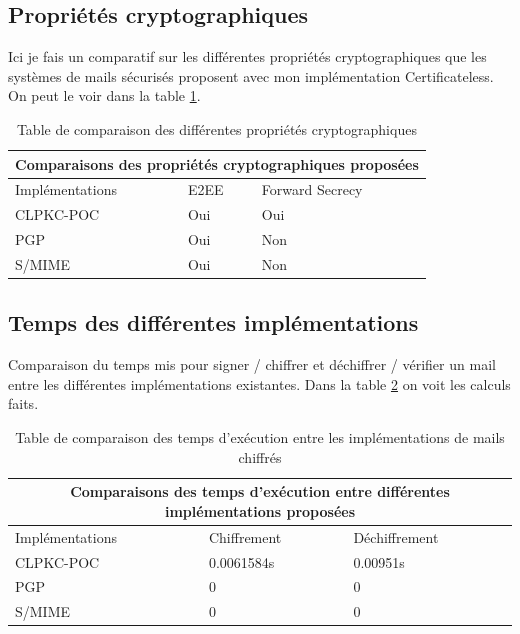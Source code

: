 \subsection{Propriétés cryptographiques}
Ici je fais un comparatif sur les différentes propriétés cryptographiques que les systèmes de mails sécurisés proposent avec mon implémentation Certificateless. On peut le voir dans la table \ref{table:comparisonProperties}.
\begin{table}[h!]
	\centering
	\begin{tabular}{ |p{3cm}||p{3cm}|p{3cm}| }
		\hline
		\multicolumn{3}{|c|}{Comparaisons des propriétés cryptographiques proposées} \\
		\hline
		Implémentations & E2EE & Forward Secrecy\\
		\hline
		CLPKC-POC   & Oui & Oui\\
		PGP & Oui & Non\\
		S/MIME & Oui & Non\\
		\hline
	\end{tabular}
	\caption{Table de comparaison des différentes propriétés cryptographiques }
	\label{table:comparisonProperties}
\end{table}
\subsection{Temps des différentes implémentations}
Comparaison du temps mis pour signer / chiffrer et déchiffrer / vérifier un mail entre les différentes implémentations existantes. Dans la table \ref{table:comparisonTime} on voit les calculs faits.
\begin{table}[h!]
	\centering
	\begin{tabular}{ |p{3cm}||p{3cm}|p{3cm}| }
		\hline
		\multicolumn{3}{|c|}{Comparaisons des temps d'exécution entre différentes implémentations proposées} \\
		\hline
		Implémentations & Chiffrement & Déchiffrement\\
		\hline
		CLPKC-POC   & 0.0061584s & 0.00951s\\
		PGP & 0 & 0\\
		S/MIME & 0 & 0\\
		\hline
	\end{tabular}
	\caption{Table de comparaison des temps d'exécution entre les implémentations de mails chiffrés}
	\label{table:comparisonTime}
\end{table}
